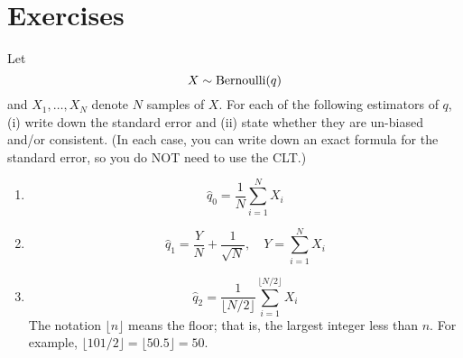 \section*{Exercises}
\begin{exercise}\label{ex:1}
Let
\begin{equation*}
X \sim {\rm Bernoulli}(q)
\end{equation*}
and $X_1,\dots,X_N$ denote $N$ samples of $X$. 
For each of the following estimators of $q$, (i) write down the standard error and (ii) state whether they are un-biased and/or consistent. (In each case, you can write down an exact formula for the standard error, so you do NOT need to use the CLT.)
\begin{enumerate}[label=(\alph*)]
\item 
\begin{equation*}
\hat{q}_{0} = \frac{1}{N}\sum_{i=1}^NX_i
\end{equation*}
\item 
\begin{equation*}
\hat{q}_{1} = \frac{Y}{N} + \frac{1}{\sqrt{N}},\quad Y = \sum_{i=1}^NX_i
\end{equation*}
\item 
\begin{equation*}
\hat{q}_{2} = \frac{1}{\lfloor N/2 \rfloor}\sum_{i=1}^{\lfloor N/2 \rfloor}X_i
\end{equation*}
The notation $\lfloor  n \rfloor$ means the floor; that is, the largest integer less than $n$. For example, $\lfloor 101/2 \rfloor = \lfloor 50.5 \rfloor = 50$. 
\end{enumerate}

\end{exercise}





